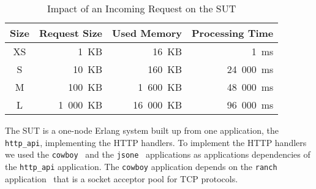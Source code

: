 \documentclass{llncs}
\begin{document}
\begin{table}[htbp]
\centering
 \caption{Impact of an Incoming Request on the SUT}
 \label{tab:ed-proc}
\begin{tabular}{|c|r|r|r|}
\hline
Size & Request Size & Used Memory & Processing Time\\\hline\hline
XS & 1~KB & 16~KB & 1~ms \\\hline
S & 10~KB & 160~KB & 24~000~ms \\\hline
M & 100~KB & 1~600~KB & 48~000~ms \\\hline
L & 1~000~KB & 16~000~KB & 96~000~ms \\
\hline
\end{tabular}
\end{table}


The SUT is a one-node Erlang system built up from one application, the \verb+http_api+, implementing the HTTP handlers. To implement the HTTP handlers we used the  \verb+cowboy+~\cite{cowboy} and the \verb+jsone+~\cite{json} applications as applications dependencies of the \verb+http_api+ application. The \verb+cowboy+ application depends on the \verb+ranch+ application~\cite{ranch} that is a socket acceptor pool for TCP protocols.

%
\end{document}

